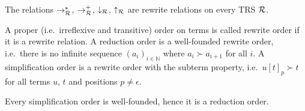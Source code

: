 \begin{lemma}
	The relations $\rightarrow^*_{\mathcal R}$, 
	$\rightarrow^+_{\mathcal R}$,
	$\downarrow_{\mathcal R}$, $\uparrow_{\mathcal R}$ are rewrite relations on every TRS ${\mathcal R}$.
\end{lemma}
\begin{definition}
	A proper (i.e.~irreflexive and transitive) order on terms is called {\myem rewrite order} if it is a rewrite relation.
	A {\myem reduction order} is a well-founded rewrite order,
	i.e.~there is no infinite sequence 
	$(a_i)_{i\in\mathbb{N}}$
	where $a_i\succ a_{i+1}$ for all $i$.
	A {\myem simplification order} is a rewrite order with the {\myem subterm property},
	i.e.~$u[t]_p \succ t$ for all terms $u$, $t$ and positions $p\neq\epsilon$.
\end{definition}
\begin{lemma}
	Every simplification order is well-founded, hence it is a reduction order.
\end{lemma}



